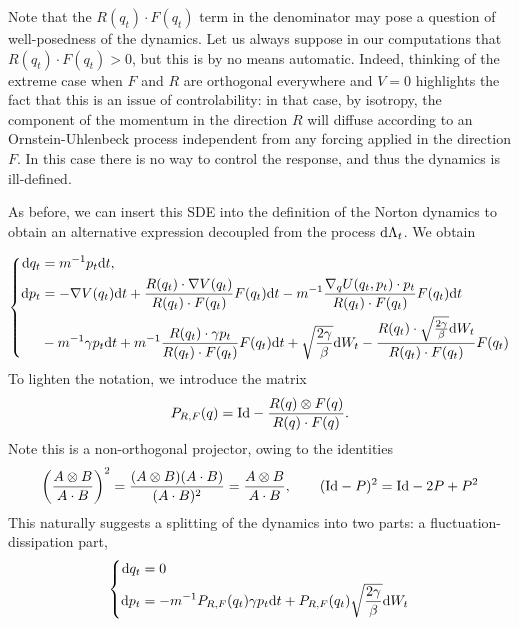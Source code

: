 \begin{remark}
    \label{rem:norton_sv_well_posedness}
    Note that the $R(q_t)\cdot F(q_t)$ term in the denominator may pose a question of well-posedness of the dynamics. Let us always suppose in our computations that $R(q_t)\cdot F(q_t)>0$, but this is by no means automatic.
    Indeed, thinking of the extreme case when $F$ and $R$ are orthogonal everywhere and $V=0$ highlights the fact that this is an issue of controlability: in that case, by isotropy, the component of the momentum in the direction $R$ will diffuse according to an Ornstein-Uhlenbeck process independent from any forcing applied in the direction $F$. In this case there is no way to control the response, and thus the dynamics is ill-defined. 
\end{remark}
As before, we can insert this SDE into the definition of the Norton dynamics to obtain
an alternative expression decoupled from the process $\mathrm{d} \Lambda_t$. We obtain

\begin{equation}
    \label{eq:norton_sv_dynamics_solved}
    \left\{
        \begin{aligned}
            \mathrm{d} q_t &= m^{-1}p_t\mathrm{d} t,\\
            \mathrm{d} p_t &= -\nabla V(q_t)\mathrm{d} t +\frac{R(q_t)\cdot \nabla V(q_t)}{R(q_t)\cdot F(q_t)}F(q_t)\mathrm{d} t-m^{-1}\frac{\nabla_q U(q_t,p_t)\cdot p_t}{R(q_t)\cdot F(q_t)}F(q_t)\mathrm{d} t\\
            &-m^{-1}\gamma p_t\mathrm{d} t+m^{-1}\frac{R(q_t)\cdot \gamma p_t}{R(q_t)\cdot F(q_t)}F(q_t)\mathrm{d} t+\sqrt{\frac{2\gamma}{\beta}}\mathrm{d} W_t-\frac{R(q_t)\cdot \sqrt{\frac{2\gamma}{\beta}}\mathrm{d} W_t}{R(q_t)\cdot F(q_t)}F(q_t)\\
                \end{aligned}
    \right.
\end{equation}
To lighten the notation, we introduce the matrix
\begin{equation}
    \label{eq:norton_sv_M_definition}
    P_{R,F}(q)=\mathrm{Id}-\frac{R(q)\otimes F(q)}{R(q)\cdot F(q)}.
\end{equation}
Note this is a non-orthogonal projector, owing to the identities
\[\left(\frac{A\otimes B}{A\cdot B}\right)^2=\frac{(A\otimes B)(A\cdot B)}{(A\cdot B)^2}=\frac{A\otimes B}{A\cdot B},\qquad (\mathrm{Id}-P)^2=\mathrm{Id}-2P+P^2\]
This naturally suggests a splitting of the dynamics into two parts: a fluctuation-dissipation part,
\begin{equation}
    \label{eq:norton_sv_fd_part}
    \left\{\begin{aligned}
        \mathrm{d} q_t&=0\\
        \mathrm{d} p_t&=-m^{-1}P_{R,F}(q_t)\gamma p_t\mathrm{d} t+P_{R,F}(q_t)\sqrt{\frac{2\gamma}{\beta}}\mathrm{d} W_t
    \end{aligned}\right.
\end{equation}

